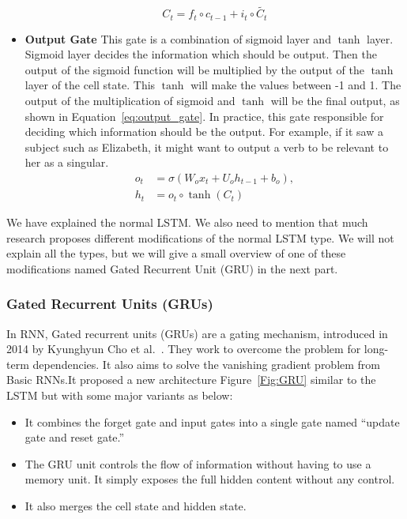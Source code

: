 \begin{itemize}
\begin{equation}\label{eq:multiplication_gate}
C_t = f_t \circ c_{t-1} + i_t \circ \widetilde{C_t}
\end{equation}
   
  \item \textbf{Output Gate} This gate is a combination of sigmoid layer and $\tanh$ layer. Sigmoid layer decides the information which should be output. Then the output of the  sigmoid function will be multiplied by the output of the $\tanh$ layer of the cell state. This $\tanh$ will make the values between -1 and 1. The output of the multiplication of sigmoid and $\tanh$ will be the final output, as shown in Equation~\eqref{eq:output_gate}. In practice, this gate responsible for deciding which information should be the output. For example, if it saw a subject such as Elizabeth, it might want to output a verb to be relevant to her as a singular.%
\begin{subequations}\label{eq:output_gate}
\begin{align}
o_t &= \sigma(W_o x_t + U_o h_{t-1} + b_o),\\
h_t &= o_t \circ \tanh(C_t)
\end{align}
\end{subequations}%
\end{itemize}

We have explained the normal LSTM. We also need to mention that much research proposes different modifications of the normal LSTM type. We will not explain all the types, but we will give a small overview of one of these modifications named Gated Recurrent Unit (GRU) in the next part.

\subsubsection{Gated Recurrent Units (GRUs)}

In RNN, Gated recurrent units (GRUs) are a gating mechanism, introduced in 2014 by Kyunghyun Cho et al.~\cite{Cho_et_al}. They work to overcome the problem for long-term dependencies. It also aims to solve the vanishing gradient problem from Basic RNNs.It proposed a new architecture Figure~\ref{Fig:GRU} similar to the LSTM but with some major variants as below:

\begin{itemize}
\item It combines the forget gate and input gates into a single gate named “update gate and reset gate.”
\item The GRU unit controls the flow of information without having to use a memory unit. It simply exposes the full hidden content without any control.
\item It also merges the cell state and hidden state.
\end{itemize}%

